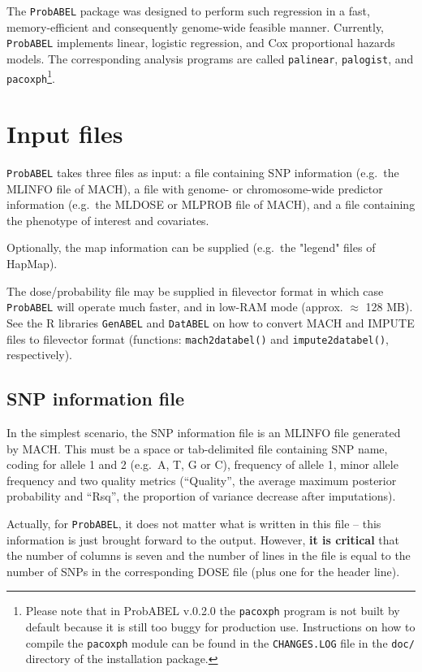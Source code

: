 \documentclass[12pt,a4paper]{article}
\newcommand{\PA}{\texttt{ProbABEL}}
\newcommand{\GA}{\texttt{GenABEL}}
\newcommand{\DA}{\texttt{DatABEL}}
\begin{document}
The \PA{} package was designed to perform such regression
in a fast, memory-efficient and consequently genome-wide feasible manner.
Currently, \PA{} implements linear, logistic regression,
and Cox proportional hazards models. The corresponding analysis
programs are called \texttt{palinear},  \texttt{palogist},
and \texttt{pacoxph}\footnote{Please note that in ProbABEL v.0.2.0 the
  \texttt{pacoxph} program is not built by default because it is still
too buggy for production use. Instructions on how to compile the
\texttt{pacoxph} module can be found in the \texttt{CHANGES.LOG} file
in the \texttt{doc/} directory of the installation package.}.


\section{Input files}
\PA{} takes three files as input: a file containing SNP
information (e.g.~the MLINFO file of MACH), a file with genome- or
chromosome-wide predictor information (e.g.~the MLDOSE or MLPROB file of MACH),
and a file containing the phenotype of interest and covariates.

Optionally, the map information can be supplied (e.g.~the "legend"
files of HapMap).

The dose/probability file may be supplied in filevector format
in which case \PA{} will operate much faster, and
in low-RAM mode (approx. $\approx$ 128 MB). See the R libraries \GA{} and
\DA{} on how to convert MACH and IMPUTE files to
filevector format (functions: \texttt{mach2databel()} and
\texttt{impute2databel()}, respectively).

\subsection{SNP information file}
\label{ssec:infoin}
In the simplest scenario, the SNP information file is an MLINFO
file generated by MACH. This must be a space or tab-delimited file
containing SNP name, coding for allele 1 and 2 (e.g.~A, T, G or C),
frequency of allele 1, minor allele frequency and two quality
metrics (``Quality'', the average maximum posterior probability and
``Rsq'', the proportion of variance decrease after imputations).

Actually,
for \PA{}, it does not matter what is written in this file --
this information is just brought forward to the output. However,
\textbf{it is critical} that the number of columns is seven and the number
of lines in the file is equal to the number of SNPs in the
corresponding DOSE file (plus one for the header line).
\end{document}
